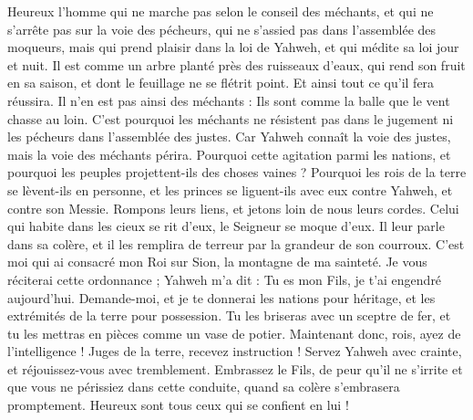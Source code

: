 \begin{multicols}{2}
\VerseOne{}Heureux l'homme qui ne marche pas selon le conseil des méchants, et qui ne s'arrête pas sur la voie des pécheurs, qui ne s'assied pas dans l'assemblée des moqueurs,
mais qui prend plaisir dans la loi de Yahweh, et qui médite sa loi jour et nuit.
Il est comme un arbre planté près des ruisseaux d'eaux, qui rend son fruit en sa saison, et dont le feuillage ne se flétrit point. Et ainsi tout ce qu'il fera réussira.
Il n'en est pas ainsi des méchants : Ils sont comme la balle que le vent chasse au loin.
C'est pourquoi les méchants ne résistent pas dans le jugement ni les pécheurs dans l'assemblée des justes.
Car Yahweh connaît la voie des justes, mais la voie des méchants périra.
\VerseOne{}Pourquoi cette agitation parmi les nations, et pourquoi les peuples projettent-ils des choses vaines ?
Pourquoi les rois de la terre se lèvent-ils en personne, et les princes se liguent-ils avec eux contre Yahweh, et contre son Messie.
Rompons leurs liens, et jetons loin de nous leurs cordes.
Celui qui habite dans les cieux se rit d'eux, le Seigneur se moque d'eux.
Il leur parle dans sa colère, et il les remplira de terreur par la grandeur de son courroux.
C'est moi qui ai consacré mon Roi sur Sion, la montagne de ma sainteté.
Je vous réciterai cette ordonnance ; Yahweh m'a dit : Tu es mon Fils, je t'ai engendré aujourd'hui.
Demande-moi, et je te donnerai les nations pour héritage, et les extrémités de la terre pour possession.
Tu les briseras avec un sceptre de fer, et tu les mettras en pièces comme un vase de potier.
Maintenant donc, rois, ayez de l'intelligence ! Juges de la terre, recevez instruction !
Servez Yahweh avec crainte, et réjouissez-vous avec tremblement.
Embrassez le Fils, de peur qu'il ne s'irrite et que vous ne périssiez dans cette conduite, quand sa colère s'embrasera promptement. Heureux sont tous ceux qui se confient en lui !

\end{multicols}
